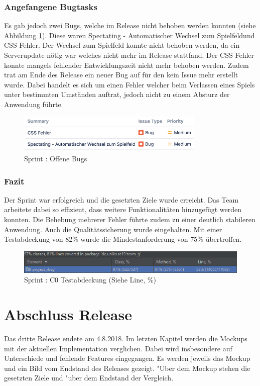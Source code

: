\documentclass[12pt, titlepage]{scrartcl}
\newcommand{\RN}[1]{%
	\textup{\uppercase\expandafter{\romannumeral#1}}%
}
\begin{document}
    		\subsubsection{Angefangene Bugtasks}
    			Es gab jedoch zwei Bugs, welche im Release \RN{3} nicht behoben werden konnten (siehe Abbildung \ref{Open_Bugs_6}). Diese waren \glqq Spectating - Automatischer Wechsel zum Spielfeld\grqq und \glqq CSS Fehler\grqq. Der Wechsel zum Spielfeld konnte nicht behoben werden, da ein Serverupdate n\"otig war welches nicht mehr im Release \RN{3} stattfand. Der CSS Fehler konnte mangels fehlender Entwicklungszeit nicht mehr behoben werden. Zudem trat am Ende des Release \RN{3} ein neuer Bug auf f\"ur den kein Issue mehr erstellt wurde. Dabei handelt es sich um einen Fehler welcher beim Verlassen eines Spiels unter bestimmten Umst\"anden auftrat, jedoch nicht zu einem Absturz der Anwendung f\"uhrte.
    			\begin{figure}[H]
    				\centering
    				\includegraphics[width=0.8\textwidth]{images/sprintVI/openBugs.png}
    				\caption{Sprint \RN{6}: Offene Bugs}
    				\label{Open_Bugs_6}
    			\end{figure}
	    	\subsubsection{Fazit}
	    		Der Sprint \RN{6} war erfolgreich und die gesetzten Ziele wurde erreicht. Das Team arbeitete dabei so effizient, dass weitere Funktionalit\"aten hinzugef\"ugt werden konnten. Die Behebung mehrerer Fehler f\"uhrte zudem zu einer deutlich stabileren Anwendung. Auch die Qualit\"atssicherung wurde eingehalten. Mit einer Testabdeckung von 82\% wurde die Mindestanforderung von 75\% \"ubertroffen.
	    		\begin{figure}[H] 
	    			\centering
	    			\includegraphics[width=\textwidth]{images/sprintVI/coverage.png}
	    			\caption{Sprint \RN{6}: C0 Testabdeckung (Siehe Line, \%)}
	    			\label{Coverage_6}
	    		\end{figure} 
	\newpage
	\section{Abschluss Release \RN{3}}
		Das dritte Release endete am 4.8.2018. Im letzten Kapitel werden die Mockups mit der aktuellen Implementation verglichen. Dabei wird insbesondere auf Unterschiede und fehlende Features eingegangen. Es werden jeweils das Mockup und ein Bild vom Endstand des Releases gezeigt. "Uber dem Mockup stehen die gesetzten Ziele und "uber dem Endstand der Vergleich.
\end{document}

